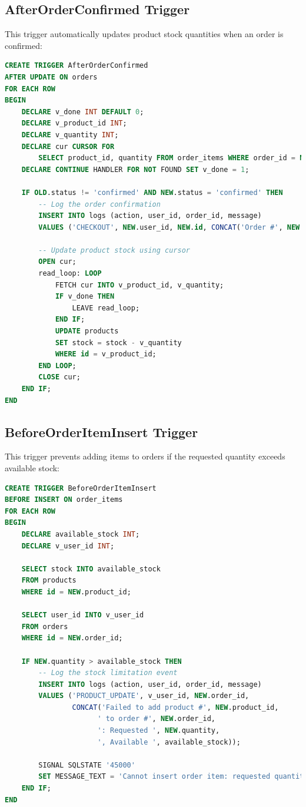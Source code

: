 \documentclass{article}
\begin{document}
\subsection{AfterOrderConfirmed Trigger}
This trigger automatically updates product stock quantities when an order is confirmed:

\begin{lstlisting}[language=SQL]
CREATE TRIGGER AfterOrderConfirmed
AFTER UPDATE ON orders
FOR EACH ROW
BEGIN
    DECLARE v_done INT DEFAULT 0;
    DECLARE v_product_id INT;
    DECLARE v_quantity INT;
    DECLARE cur CURSOR FOR 
        SELECT product_id, quantity FROM order_items WHERE order_id = NEW.id;
    DECLARE CONTINUE HANDLER FOR NOT FOUND SET v_done = 1;

    IF OLD.status != 'confirmed' AND NEW.status = 'confirmed' THEN
        -- Log the order confirmation
        INSERT INTO logs (action, user_id, order_id, message)
        VALUES ('CHECKOUT', NEW.user_id, NEW.id, CONCAT('Order #', NEW.id, ' confirmed'));

        -- Update product stock using cursor
        OPEN cur;
        read_loop: LOOP
            FETCH cur INTO v_product_id, v_quantity;
            IF v_done THEN
                LEAVE read_loop;
            END IF;
            UPDATE products
            SET stock = stock - v_quantity
            WHERE id = v_product_id;
        END LOOP;
        CLOSE cur;
    END IF;
END
\end{lstlisting}

\subsection{BeforeOrderItemInsert Trigger}
This trigger prevents adding items to orders if the requested quantity exceeds available stock:

\begin{lstlisting}[language=SQL]
CREATE TRIGGER BeforeOrderItemInsert
BEFORE INSERT ON order_items
FOR EACH ROW
BEGIN
    DECLARE available_stock INT;
    DECLARE v_user_id INT;
    
    SELECT stock INTO available_stock
    FROM products
    WHERE id = NEW.product_id;
    
    SELECT user_id INTO v_user_id
    FROM orders
    WHERE id = NEW.order_id;

    IF NEW.quantity > available_stock THEN
        -- Log the stock limitation event
        INSERT INTO logs (action, user_id, order_id, message)
        VALUES ('PRODUCT_UPDATE', v_user_id, NEW.order_id, 
                CONCAT('Failed to add product #', NEW.product_id, 
                      ' to order #', NEW.order_id, 
                      ': Requested ', NEW.quantity, 
                      ', Available ', available_stock));
                
        SIGNAL SQLSTATE '45000'
        SET MESSAGE_TEXT = 'Cannot insert order item: requested quantity exceeds available stock';
    END IF;
END
\end{lstlisting}
\end{document}
